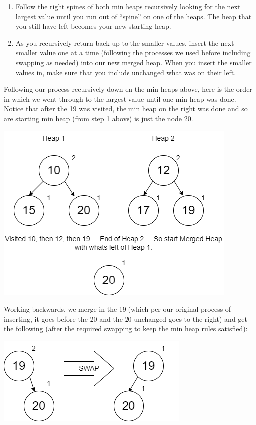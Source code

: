 \documentclass[
]{book}
\providecommand{\tightlist}{%
  \setlength{\itemsep}{0pt}\setlength{\parskip}{0pt}}
\begin{document}
\begin{enumerate}
\def\labelenumi{\arabic{enumi}.}
\tightlist
\item
  Follow the right spines of both min heaps recursively looking for the next largest value until you run out of ``spine'' on one of the heaps. The heap that you still have left becomes your new starting heap.
\item
  As you recursively return back up to the smaller values, insert the next smaller value one at a time (following the processes we used before including swapping as needed) into our new merged heap. When you insert the smaller values in, make sure that you include unchanged what was on their left.
\end{enumerate}

Following our process recursively down on the min heaps above, here is the order in which we went through to the largest value until one min heap was done. Notice that after the 19 was visited, the min heap on the right was done and so are starting min heap (from step 1 above) is just the node 20.

\includegraphics{images/heap_del2.drawio.png}

Working backwards, we merge in the 19 (which per our original process of inserting, it goes before the 20 and the 20 unchanged goes to the right) and get the following (after the required swapping to keep the min heap rules satisfied):

\includegraphics{images/heap_del3.drawio.png}
\end{document}

